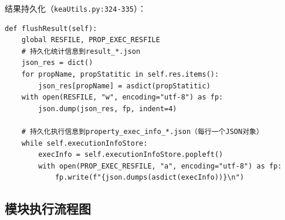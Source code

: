 \documentclass[a4paper, zihao=-4]{ctexart}
\newcommand{\bff}[1]{{\heiti #1}}
\begin{document}
\bff{结果持久化}（\texttt{keaUtils.py:324-335}）：

\begin{lstlisting}
def flushResult(self):
    global RESFILE, PROP_EXEC_RESFILE
    # 持久化统计信息到result_*.json
    json_res = dict()
    for propName, propStatitic in self.res.items():
        json_res[propName] = asdict(propStatitic)
    with open(RESFILE, "w", encoding="utf-8") as fp:
        json.dump(json_res, fp, indent=4)
    
    # 持久化执行信息到property_exec_info_*.json（每行一个JSON对象）
    while self.executionInfoStore:
        execInfo = self.executionInfoStore.popleft()
        with open(PROP_EXEC_RESFILE, "a", encoding="utf-8") as fp:
            fp.write(f"{json.dumps(asdict(execInfo))}\n")
\end{lstlisting}

\subsection{模块执行流程图}
\end{document}
